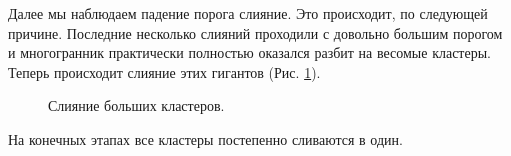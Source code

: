 \documentclass[a4paper,12pt, titlepage]{article}
\begin{document}
Далее мы наблюдаем падение порога слияние. Это происходит, по следующей причине.
Последние несколько слияний проходили с довольно большим порогом и многогранник практически полностью оказался разбит на 
весомые кластеры. Теперь происходит слияние этих гигантов (Рис. \ref{32516215}).   

\begin{figure}[h]
\noindent{}
\caption{Слияние больших кластеров.}
\label{32516215}
\end{figure}
\newpage

На конечных этапах все кластеры постепенно сливаются в один.\\
\end{document}

